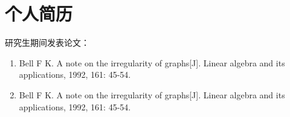 

\chapter*{个人简历}

研究生期间发表论文：
\begin{enumerate}
\renewcommand{\labelenumi}{[\theenumi]}
\item Bell F K. A note on the irregularity of graphs[J]. Linear algebra and its applications, 1992, 161: 45-54.
\item Bell F K. A note on the irregularity of graphs[J]. Linear algebra and its applications, 1992, 161: 45-54.
\end{enumerate}
